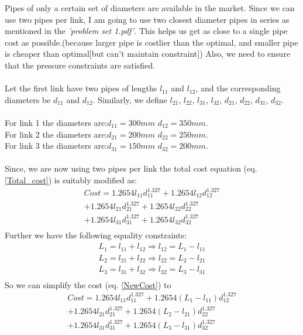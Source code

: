 \documentclass{homework}
\begin{document}
Pipes of only a certain set of diameters are available in the market.
Since we can use two pipes per link, I am going to use two closest diameter
pipes in series as mentioned in the \emph{'problem set 1.pdf'}. This helps us get as close to a single pipe cost as possible.(because larger pipe is costlier than the optimal, and smaller pipe is cheaper than optimal[but can't maintain constraint]) Also, we need to ensure that the pressure constraints are satisfied. \\\\
Let the first link have two pipes of lengths $l_{11}$ and $l_{12}$, and the corresponding diameters be $d_{11}$ and $d_{12}$. Similarly, we define $l_{21}$, $l_{22}$, $l_{31}$, $l_{32}$, $d_{21}$, $d_{22}$, $d_{31}$, $d_{32}$. \\\\
For link 1 the diameters are:\( d_{11} = 300 mm\) \(d_{12} = 350 mm\). \\
For link 2 the diameters are:\( d_{21} = 200 mm\) \(d_{22} = 250 mm\). \\
For link 3 the diameters are:\( d_{31} = 150 mm\) \(d_{32} = 200 mm\). \\\\
Since, we are now using two pipes per link the total cost equation (eq. \ref{Total_cost}) is suitably modified as:
\begin{equation}\label{NewCost}
\begin{split}
Cost = 1.2654l_{11}d_{11}^{1.327} + 1.2654l_{12}d_{12}^{1.327} \\
+ 1.2654l_{21}d_{21}^{1.327} + 1.2654l_{22}d_{22}^{1.327} \\
+ 1.2654l_{31}d_{31}^{1.327} + 1.2654l_{32}d_{32}^{1.327} \\
\end{split}
\end{equation}
Further we have the following equality constraints:
\begin{equation}\label{NewEC}
\begin{split}
 L_1 = l_{11} + l_{12} \Rightarrow l_{12} = L_1 - l_{11} \\
 L_2 = l_{21} + l_{22} \Rightarrow l_{22} = L_2 - l_{21} \\
 L_3 = l_{31} + l_{32} \Rightarrow l_{32} = L_3 - l_{31}  \\
\end{split}
\end{equation}
So we can simplify the cost (eq. \ref{NewCost}) to
\begin{equation}\label{FinalCost}
\begin{split}
Cost = 1.2654l_{11}d_{11}^{1.327} + 1.2654(L_1 - l_{11})d_{12}^{1.327} \\
+ 1.2654l_{21}d_{21}^{1.327} + 1.2654(L_2 - l_{21})d_{22}^{1.327} \\
+ 1.2654l_{31}d_{31}^{1.327} + 1.2654(L_3 - l_{31})d_{32}^{1.327} \\
\end{split}
\end{equation}
\end{document}
